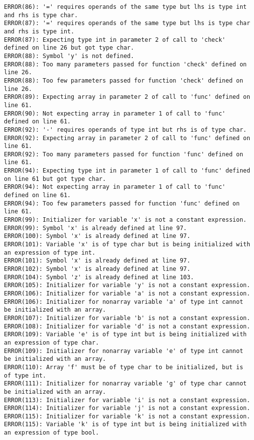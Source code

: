 \documentclass[12pt]{book}
\begin{document}
\begin{lstlisting}
ERROR(86): '=' requires operands of the same type but lhs is type int and rhs is type char.
ERROR(87): '=' requires operands of the same type but lhs is type char and rhs is type int.
ERROR(87): Expecting type int in parameter 2 of call to 'check' defined on line 26 but got type char.
ERROR(88): Symbol 'y' is not defined.
ERROR(88): Too many parameters passed for function 'check' defined on line 26.
ERROR(88): Too few parameters passed for function 'check' defined on line 26.
ERROR(89): Expecting array in parameter 2 of call to 'func' defined on line 61.
ERROR(90): Not expecting array in parameter 1 of call to 'func' defined on line 61.
ERROR(92): '-' requires operands of type int but rhs is of type char.
ERROR(92): Expecting array in parameter 2 of call to 'func' defined on line 61.
ERROR(92): Too many parameters passed for function 'func' defined on line 61.
ERROR(94): Expecting type int in parameter 1 of call to 'func' defined on line 61 but got type char.
ERROR(94): Not expecting array in parameter 1 of call to 'func' defined on line 61.
ERROR(94): Too few parameters passed for function 'func' defined on line 61.
ERROR(99): Initializer for variable 'x' is not a constant expression.
ERROR(99): Symbol 'x' is already defined at line 97.
ERROR(100): Symbol 'x' is already defined at line 97.
ERROR(101): Variable 'x' is of type char but is being initialized with an expression of type int.
ERROR(101): Symbol 'x' is already defined at line 97.
ERROR(102): Symbol 'x' is already defined at line 97.
ERROR(104): Symbol 'z' is already defined at line 103.
ERROR(105): Initializer for variable 'y' is not a constant expression.
ERROR(106): Initializer for variable 'a' is not a constant expression.
ERROR(106): Initializer for nonarray variable 'a' of type int cannot be initialized with an array.
ERROR(107): Initializer for variable 'b' is not a constant expression.
ERROR(108): Initializer for variable 'd' is not a constant expression.
ERROR(109): Variable 'e' is of type int but is being initialized with an expression of type char.
ERROR(109): Initializer for nonarray variable 'e' of type int cannot be initialized with an array.
ERROR(110): Array 'f' must be of type char to be initialized, but is of type int.
ERROR(111): Initializer for nonarray variable 'g' of type char cannot be initialized with an array.
ERROR(113): Initializer for variable 'i' is not a constant expression.
ERROR(114): Initializer for variable 'j' is not a constant expression.
ERROR(115): Initializer for variable 'k' is not a constant expression.
ERROR(115): Variable 'k' is of type int but is being initialized with an expression of type bool.

\end{lstlisting}
\end{document}
